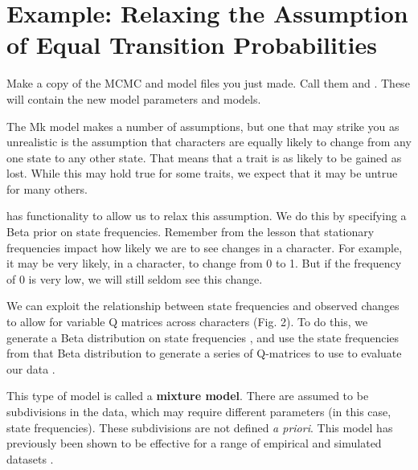 \section{Example: Relaxing the Assumption of Equal Transition Probabilities }\label{sec:dm_disc}


{\begin{framed}
Make a copy of the MCMC and model files you just made. 
Call them  and . 
These will contain the new model parameters and models. \par 
\end{framed}}
\begin{figure}[h!]
\label{fig:module-gm}
\end{figure}
The Mk model makes a number of assumptions, but one that may strike you as unrealistic is the assumption that characters are equally likely to change from any one state to any other state.
That means that a trait is as likely to be gained as lost.
While this may hold true for some traits, we expect that it may be untrue for many others. \par
{} has functionality to allow us to relax this assumption.
We do this by specifying a Beta prior on state frequencies.
Remember from the  lesson that stationary frequencies impact how likely we are to see changes in a character.
For example, it may be very likely, in a character, to change from 0 to 1.
But if the frequency of 0 is very low, we will still seldom see this change. \par
We can exploit the relationship between state frequencies and observed changes to allow for variable Q matrices across characters (Fig. 2).
To do this, we generate a Beta distribution on state frequencies \citep{huelsenbeck01c}, and use the state frequencies from that Beta distribution to generate a series of Q-matrices to use to evaluate our data \citep{pagel04}. \par
This type of model is called a \textbf{mixture model}.
There are assumed to be subdivisions in the data, which may require different parameters (in this case, state frequencies).
These subdivisions are not defined \textit{a priori}. 
This model has previously been shown to be effective for a range of empirical and simulated datasets \citep{wright16}.\par




